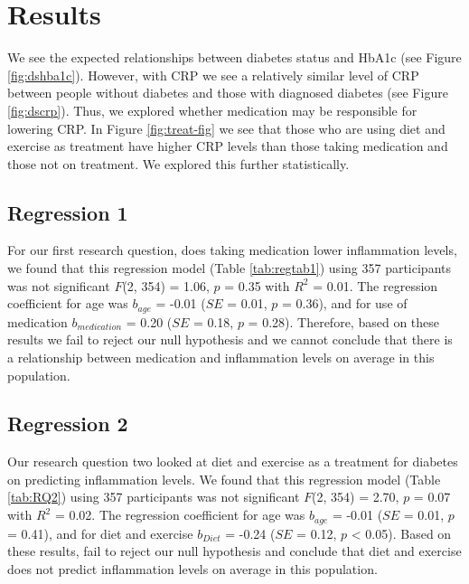 \documentclass[
  man]{apa6}
\begin{document}
\hypertarget{results}{%
\section{Results}\label{results}}

We see the expected relationships between diabetes status and HbA1c (see Figure \ref{fig:dshba1c}). However, with CRP we see a relatively similar level of CRP between people without diabetes and those with diagnosed diabetes (see Figure \ref{fig:dscrp}). Thus, we explored whether medication may be responsible for lowering CRP. In Figure \ref{fig:treat-fig} we see that those who are using diet and exercise as treatment have higher CRP levels than those taking medication and those not on treatment. We explored this further statistically.

\hypertarget{regression-1}{%
\subsection{Regression 1}\label{regression-1}}

For our first research question, does taking medication lower inflammation levels, we found that this regression model (Table \ref{tab:regtab1}) using 357 participants was not significant \(F\)(2, 354) = 1.06, \(p\) = 0.35 with \(R^2\) = 0.01. The regression coefficient for age was \(b_{age}\) = -0.01 (\(SE\) = 0.01, \(p\) = 0.36), and for use of medication \(b_{medication}\) = 0.20 (\(SE\) = 0.18, \(p\) = 0.28). Therefore, based on these results we fail to reject our null hypothesis and we cannot conclude that there is a relationship between medication and inflammation levels on average in this population.

\hypertarget{regression-2}{%
\subsection{Regression 2}\label{regression-2}}

Our research question two looked at diet and exercise as a treatment for diabetes on predicting inflammation levels. We found that this regression model (Table \ref{tab:RQ2}) using 357 participants was not significant \(F\)(2, 354) = 2.70, \(p\) = 0.07 with \(R^2\) = 0.02. The regression coefficient for age was \(b_{age}\) = -0.01 (\(SE\) = 0.01, \(p\) = 0.41), and for diet and exercise \(b_{Diet}\) = -0.24 (\(SE\) = 0.12, \(p\) \textless{} 0.05). Based on these results, fail to reject our null hypothesis and conclude that diet and exercise does not predict inflammation levels on average in this population.
\end{document}
